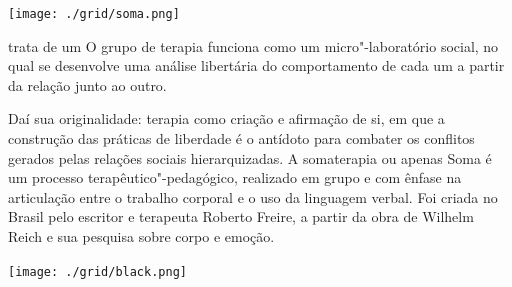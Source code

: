 \pagebreak %

\begin{center}
\hspace*{.5cm}\texttt{[image: ./grid/soma.png]}
\end{center}

\hspace*{-7cm}\hrulefill\hspace*{-7cm}

\medskip

 trata de um  O grupo de terapia funciona como um micro"-laboratório social, no qual se desenvolve uma análise libertária do comportamento de cada um a partir da relação junto ao outro.

Daí sua originalidade: terapia como criação e afirmação de si, em que a construção das práticas de liberdade é o antídoto para combater os conflitos gerados pelas relações sociais hierarquizadas. A somaterapia ou apenas Soma é um processo terapêutico"-pedagógico, realizado em grupo e com ênfase na articulação entre o trabalho corporal e o uso da linguagem verbal. Foi criada no Brasil pelo escritor e terapeuta Roberto Freire, a partir da obra de Wilhelm Reich e sua pesquisa sobre corpo e emoção.

\vfill

\hspace*{-.4cm}\begin{minipage}[c]{.5\linewidth}
\small{
{}}
\end{minipage}

\pagebreak %

\begin{center}
\hspace*{-3.6cm}
\hspace*{3.1cm}\texttt{[image: ./grid/black.png]}
\end{center}

